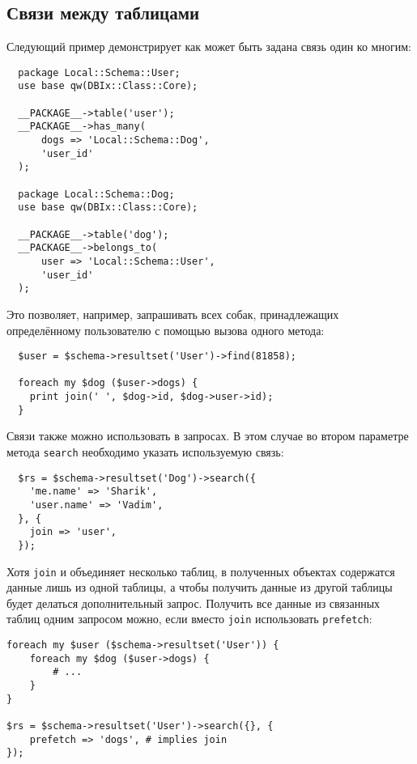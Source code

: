 \subsection{Связи между таблицами}
Следующий пример демонстрирует как может быть задана связь один ко многим:
\begin{verbatim}
  package Local::Schema::User;
  use base qw(DBIx::Class::Core);

  __PACKAGE__->table('user');
  __PACKAGE__->has_many(
      dogs => 'Local::Schema::Dog',
      'user_id'
  );

  package Local::Schema::Dog;
  use base qw(DBIx::Class::Core);

  __PACKAGE__->table('dog');
  __PACKAGE__->belongs_to(
      user => 'Local::Schema::User',
      'user_id'
  );
\end{verbatim}
Это позволяет, например, запрашивать всех собак, принадлежащих определённому пользователю с помощью вызова одного метода:
\begin{verbatim}
  $user = $schema->resultset('User')->find(81858);

  foreach my $dog ($user->dogs) {
    print join(' ', $dog->id, $dog->user->id);
  }
\end{verbatim}
Связи также можно использовать в запросах. В этом случае во втором параметре метода \verb|search| необходимо указать используемую связь:
\begin{verbatim}
  $rs = $schema->resultset('Dog')->search({
    'me.name' => 'Sharik',
    'user.name' => 'Vadim',
  }, {
    join => 'user',
  });
\end{verbatim}
Хотя \verb|join| и объединяет несколько таблиц, в полученных объектах содержатся данные лишь из одной таблицы, а чтобы получить данные из другой таблицы будет делаться дополнительный запрос. Получить все данные из связанных таблиц одним запросом можно, если вместо \verb|join| использовать \verb|prefetch|:
\begin{verbatim}
foreach my $user ($schema->resultset('User')) {
    foreach my $dog ($user->dogs) {
        # ...
    }
}

$rs = $schema->resultset('User')->search({}, {
    prefetch => 'dogs', # implies join
});
\end{verbatim}

